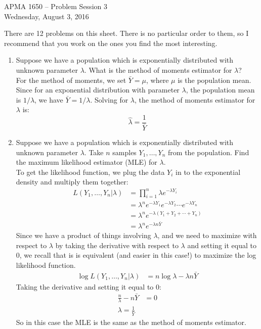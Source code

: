 \documentclass[12pt]{article}
\begin{document}
\title{}
\author{\vspace{-10ex} }

\begin{center}
{\LARGE APMA 1650 -- Problem Session 3}\\
\vspace{5mm}
{\large Wednesday, August 3, 2016}\\
\end{center}

There are 12 problems on this sheet. There is no particular order to them, so I recommend that you work on the ones you find the most interesting.

\begin{enumerate}

\item Suppose we have a population which is exponentially distributed with unknown parameter $\lambda$. What is the method of moments estimator for $\lambda$?\\

For the method of moments, we set $\bar{Y} = \mu$, where $\mu$ is the population mean. Since for an exponential distribution with parameter $\lambda$, the population mean is $1/\lambda$, we have $\bar{Y} = 1 / \lambda$. Solving for $\lambda$, the method of moments estimator for $\lambda$ is:
\[
\hat{\lambda} = \dfrac{1}{\bar{Y}}
\]

\item Suppose we have a population which is exponentially distributed with unknown parameter $\lambda$. Take $n$ samples $Y_1, \dots, Y_n$ from the population. Find the maximum likelihood estimator (MLE) for $\lambda$.\\

To get the likelihood function, we plug the data $Y_i$ in to the exponential density and multiply them together:
\begin{align*}
L(Y_1, \dots, Y_n|\lambda) &= \prod_{i=1}^n \lambda e^{-\lambda Y_i}\\
&= \lambda^n e^{-\lambda Y_1}e^{-\lambda Y_2}\cdots e^{-\lambda Y_n}\\
&= \lambda^n e^{-\lambda(Y_1 + Y_2 + \cdots + Y_n)} \\
&= \lambda^n e^{-\lambda n \bar{Y}}
\end{align*}
Since we have a product of things involving $\lambda$, and we need to maximize with respect to $\lambda$ by taking the derivative with respect to $\lambda$ and setting it equal to 0, we recall that is is equivalent (and easier in this case!) to maximize the log likelihood function.
\begin{align*}
\log L(Y_1, \dots, Y_n|\lambda) &= n \log \lambda - \lambda n \bar{Y}
\end{align*}
Taking the derivative and setting it equal to 0:
\begin{align*}
\frac{n}{\lambda} - n \bar{Y} &= 0 \\
\lambda = \frac{1}{\bar{Y}}
\end{align*}
So in this case the MLE is the same as the method of moments estimator.


\end{enumerate}
\end{document}
